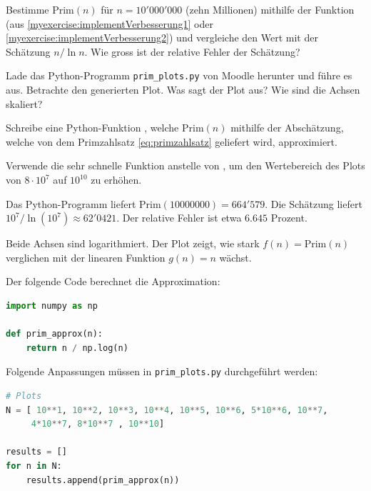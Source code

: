 \begin{myexercise}
	\begin{aenum}
		\item Bestimme $\text{Prim}(n)$ für $n = 10'000'000$ (zehn Millionen) mithilfe der Funktion  (aus \cref{myexercise:implementVerbesserung1} oder \cref{myexercise:implementVerbesserung2}) und vergleiche den Wert mit der Schätzung $n/\ln{n}$.
		Wie gross ist der relative Fehler der Schätzung?

		\item Lade das Python-Programm {\tt prim\_plots.py} von Moodle herunter und führe es aus. Betrachte den generierten Plot. Was sagt der Plot aus? Wie sind die Achsen skaliert?

		\item Schreibe eine Python-Funktion , welche $\text{Prim}(n)$ mithilfe der Abschätzung, welche von dem Primzahlsatz \ref{eq:primzahlsatz} geliefert wird, approximiert.

		\item Verwende die sehr schnelle Funktion  anstelle von , um den Wertebereich des Plots von $8\cdot 10^7$ auf $10^{10}$ zu erhöhen.
	\end{aenum}
	\begin{myanswer}
		\begin{aenum}
			\item Das Python-Programm liefert $\text{Prim}(10000000) = 664'579$. Die Schätzung liefert $10^7/\ln{(10^7)}\approx 62'0421$. Der relative Fehler ist etwa $6.645$ Prozent.

			\item Beide Achsen sind logarithmiert. Der Plot zeigt, wie stark $f(n) = \text{Prim}(n)$ verglichen mit der linearen Funktion $g(n) = n$ wächst.

			\item Der folgende Code berechnet die Approximation:

			\begin{lstlisting}[language=Python,numbers=none]
import numpy as np

def prim_approx(n):
    return n / np.log(n)
\end{lstlisting}
			\item
			Folgende Anpassungen müssen in {\tt prim\_plots.py} durchgeführt werden:
			\begin{lstlisting}[language=Python,numbers=none]
# Plots
N = [ 10**1, 10**2, 10**3, 10**4, 10**5, 10**6, 5*10**6, 10**7,
     4*10**7, 8*10**7 , 10**10]

results = []
for n in N:
    results.append(prim_approx(n))
\end{lstlisting}
		\end{aenum}
	\end{myanswer}
\end{myexercise}


